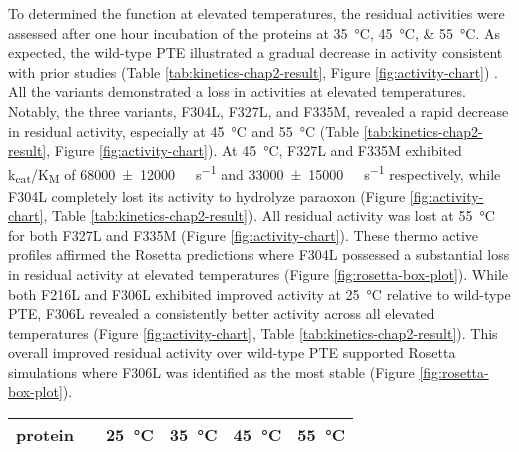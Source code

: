 \begin{refsection}
To determined the function at elevated temperatures, the residual activities
were assessed after one hour incubation of the proteins at
\SIlist{35;45;55}{\celsius}. As expected, the wild-type PTE illustrated a
gradual decrease in activity consistent with prior studies (Table
\ref{tab:kinetics-chap2-result}, Figure
\ref{fig:activity-chart}) \cite{Yang2014a,Baker2011b}. All the variants
demonstrated a loss in activities at elevated temperatures. Notably, the three
variants, F304L, F327L, and F335M, revealed a rapid decrease in residual
activity, especially at \SI{45}{\celsius} and \SI{55}{\celsius} (Table
\ref{tab:kinetics-chap2-result}, Figure \ref{fig:activity-chart}). At
\SI{45}{\celsius}, F327L and F335M exhibited
k\textsubscript{cat}/K\textsubscript{M} of
\SI{68000\pm12000}{\per\Molar\per\second} and
\SI{33000\pm15000}{\per\Molar\per\second} respectively, while F304L completely
lost its activity to hydrolyze paraoxon (Figure \ref{fig:activity-chart}, Table
\ref{tab:kinetics-chap2-result}). All residual activity was lost at \SI{55}{\celsius}
for both F327L and F335M (Figure \ref{fig:activity-chart}).  These thermo
active profiles affirmed the Rosetta predictions where F304L possessed a
substantial loss in residual activity at elevated temperatures (Figure
\ref{fig:rosetta-box-plot}). While both F216L and F306L exhibited improved
activity at \SI{25}{\celsius} relative to wild-type PTE, F306L revealed a
consistently better activity across all elevated temperatures (Figure
\ref{fig:activity-chart}, Table \ref{tab:kinetics-chap2-result}). This overall
improved residual activity over wild-type PTE supported Rosetta simulations
where F306L was identified as the most stable (Figure
\ref{fig:rosetta-box-plot}).
\begin{table}[htbp]
    \centering
    \begin{tabular}{llllll}
    \hline
    protein                 &  & \SI{25}{\celsius} & \SI{35}{\celsius} &
    \SI{45}{\celsius} & \SI{55}{\celsius} \\ 
    \hline
    

\end{tabular}
\end{table}
\end{refsection}
